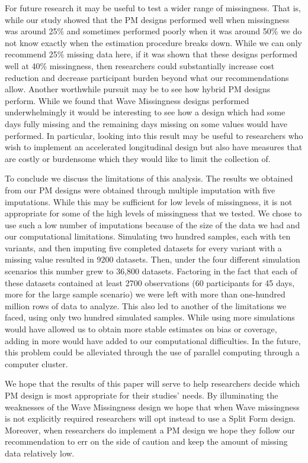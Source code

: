 \documentclass{svjour3}                     %
\begin{document}
For future research it may be useful to test a wider range of missingness. That is, while our study showed that the PM designs performed well when missingness was around 25\% and sometimes performed poorly when it was around 50\% we do not know exactly when the estimation procedure breaks down. While we can only recommend 25\% missing data here, if it was shown that these designs performed well at 40\% missingness, then researchers could substantially increase cost reduction and decrease participant burden beyond what our recommendations allow. Another worthwhile pursuit may be to see how hybrid PM designs perform. While we found that Wave Missingness designs performed underwhelmingly it would be interesting to see how a design which had some days fully missing and the remaining days missing on some values would have performed. In particular, looking into this result may be useful to researchers who wish to implement an accelerated longitudinal design but also have measures that are costly or burdensome which they would like to limit the collection of. \par

To conclude we discuss the limitations of this analysis. The results we obtained from our PM designs were obtained through multiple imputation with five imputations. While this may be sufficient for low levels of missingness, it is not appropriate for some of the high levels of missingness that we tested. We chose to use such a low number of imputations because of the size of the data we had and our computational limitations. Simulating two hundred samples, each with ten variants, and then imputing five completed datasets for every variant with a missing value resulted in 9200 datasets. Then, under the four different simulation scenarios this number grew to 36,800 datasets. Factoring in the fact that each of these datasets contained at least 2700 observations (60 participants for 45 days, more for the large sample scenario) we were left with more than one-hundred million rows of data to analyze. This also led to another of the limitations we faced, using only two hundred simulated samples. While using more simulations would have allowed us to obtain more stable estimates on bias or coverage, adding in more would have added to our computational difficulties. In the future, this problem could be alleviated through the use of parallel computing through a computer cluster. \par

We hope that the results of this paper will serve to help researchers decide which PM design is most appropriate for their studies' needs. By illuminating the weaknesses of the Wave Missingness design we hope that when Wave missingness is not explicitly required researchers will opt instead to use a Split Form design. Moreover, when researchers do implement a PM design we hope they follow our recommendation to err on the side of caution and keep the amount of missing data relatively low. \par



\end{document}
